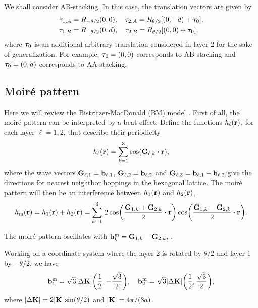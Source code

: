 We shall consider AB-stacking. In this case, the translation vectors are given by
\begin{align}
\tau_{1,A} &= R_{-\theta/2}(0,0), \quad \tau_{2,A} = R_{\theta/2} [(0,-d) + {\bm{\tau}}_0], \label{eq:tauA} \\
\tau_{1,B} &= R_{-\theta/2}(0,d), \quad \tau_{2,B} = R_{\theta/2} [(0,0) + {\bm{\tau}}_0], \label{eq:tauB}
\end{align}
where ${\bm{\tau}}_0$ is an additional arbitrary translation considered in layer 2 for the sake of generalization. For example, ${\bm{\tau}}_0 = (0,0)$ corresponds to AB-stacking and ${\bm{\tau}}_0 = (0, d)$ corresponds to AA-stacking.

\subsection{Moiré pattern}

Here we will review the Bistritzer-MacDonald (BM) model \cite{macdonald2011}. First of all, the moiré pattern can be interpreted by a beat effect. Define the functions $h_\ell({\vb{r}})$, for each layer $\ell = 1, 2$, that describe their periodicity
\begin{equation} \label{eq:beat-functions}
h_\ell(\r) = \sum_{k=1}^{3} \cos(\vb{G}_{\ell,k} \vdot \r),
\end{equation}
where the wave vectors $\vb{G}_{\ell,1} = \vb{b}_{\ell,1}$, $\vb{G}_{\ell,2} = \vb{b}_{\ell,2}$ and $\vb{G}_{\ell,3} = \vb{b}_{\ell,1} - \vb{b}_{\ell,2}$ give the directions for nearest neightbor hoppings in the hexagonal lattice. The moiré pattern will then be an interference between $h_1({\vb{r}})$ and $h_2({\vb{r}})$,
\begin{equation} \label{eq:beat-effect}
h_{\text{m}}(\r) = h_1(\r) + h_2(\r) =
\sum_{k=1}^{3}
\, 2 \cos(\frac{\vb{G}_{1,k}+\vb{G}_{2,k}}{2} \vdot \r) \cos(\frac{\vb{G}_{1,k}-\vb{G}_{2,k}}{2} \vdot \r).
\end{equation}

The moiré pattern oscillates with $\vb{b}_k^{\text{m}} = \vb{G}_{1,k} - \vb{G}_{2,k}$, \cite{handbook2019}.

\n

Working on a coordinate system where the layer 2 is rotated by $\theta/2$ and layer 1 by $-\theta/2$, we have
\begin{equation} \label{eq:moire-bvecs}
\vb{b}_1^{\text{m}} = \sqrt{3} \abs{\Delta {\vb{K}}} \qty( \frac{1}{2}, -\frac{\sqrt{3}}{2}), \quad
\vb{b}_2^{\text{m}} = \sqrt{3} \abs{\Delta {\vb{K}}} \qty( \frac{1}{2},  \frac{\sqrt{3}}{2}),
\end{equation}
where $\abs{\Delta {\vb{K}}} = 2 \abs{{\vb{K}}} \sin(\theta/2)$ and $\abs{{\vb{K}}} = 4\pi/(3a)$.

